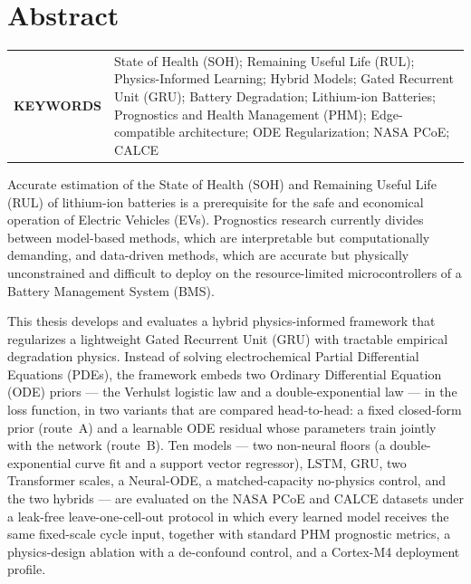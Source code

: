 \chapter{Abstract}

\begin{tabular}{@{} >{\bfseries}p{} p{} @{}}
\MakeUppercase{Keywords} &
State of Health (SOH); Remaining Useful Life (RUL); Physics-Informed Learning;
Hybrid Models; Gated Recurrent Unit (GRU); Battery Degradation;
Lithium-ion Batteries; Prognostics and Health Management (PHM);
Edge-compatible architecture; ODE Regularization; NASA PCoE; CALCE \\
\end{tabular}
\par

\begin{doublespacing}
Accurate estimation of the State of Health (SOH) and Remaining Useful Life (RUL) of lithium-ion batteries is a prerequisite for the safe and economical operation of Electric Vehicles (EVs). Prognostics research currently divides between model-based methods, which are interpretable but computationally demanding, and data-driven methods, which are accurate but physically unconstrained and difficult to deploy on the resource-limited microcontrollers of a Battery Management System (BMS).

This thesis develops and evaluates a hybrid physics-informed framework that regularizes a lightweight Gated Recurrent Unit (GRU) with tractable empirical degradation physics. Instead of solving electrochemical Partial Differential Equations (PDEs), the framework embeds two Ordinary Differential Equation (ODE) priors --- the Verhulst logistic law and a double-exponential law --- in the loss function, in two variants that are compared head-to-head: a fixed closed-form prior (route~A) and a learnable ODE residual whose parameters train jointly with the network (route~B). Ten models --- two non-neural floors (a double-exponential curve fit and a support vector regressor), LSTM, GRU, two Transformer scales, a Neural-ODE, a matched-capacity no-physics control, and the two hybrids --- are evaluated on the NASA PCoE and CALCE datasets under a leak-free leave-one-cell-out protocol in which every learned model receives the same fixed-scale cycle input, together with standard PHM prognostic metrics, a physics-design ablation with a de-confound control, and a Cortex-M4 deployment profile.


\end{doublespacing}

